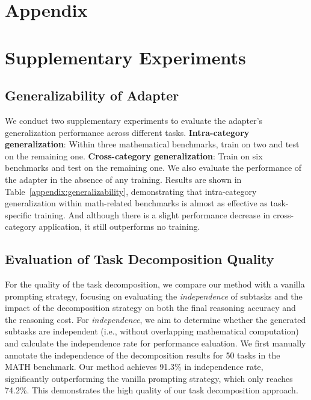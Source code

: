 \vspace{-4mm}
\section*{Appendix}
 
\appendix

\section{Supplementary Experiments}

\subsection{Generalizability of Adapter}
We conduct two supplementary experiments to evaluate the adapter's generalization performance across different tasks. 
\textbf{Intra-category generalization}: Within three mathematical benchmarks, train on two and test on the remaining one. 
\textbf{Cross-category generalization}: Train on six benchmarks and test on the remaining one. 
We also evaluate the performance of the adapter in the absence of any training.
Results are shown in Table~\ref{appendix:generalizability}, demonstrating that intra-category generalization within math-related benchmarks is almost as effective as task-specific training. And although there is a slight performance decrease in cross-category application, it still outperforms no training.



\vspace{-2mm}
\subsection{Evaluation of Task Decomposition Quality}

For the quality of the task decomposition, we compare our method with a vanilla prompting strategy, focusing on evaluating the \textit{independence} of subtasks and the impact of the decomposition strategy on both the final reasoning accuracy and the reasoning cost. 
For \textit{independence}, we aim to determine whether the generated subtasks are independent (i.e., without overlapping mathematical computation) and calculate the independence rate for performance ealuation. We first manually annotate the independence of the decomposition results for 50 tasks in the MATH benchmark. Our method achieves 91.3\% in independence rate, significantly outperforming the vanilla prompting strategy, which only reaches 74.2\%. This demonstrates the high quality of our task decomposition approach. 

